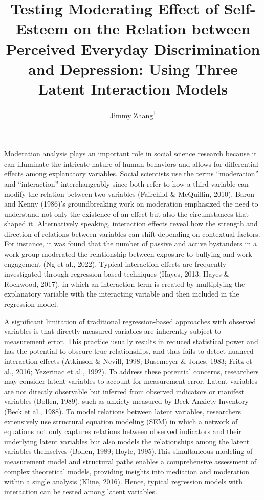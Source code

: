 \documentclass[
  man]{apa7}
\title{Testing Moderating Effect of Self-Esteem on the Relation between Perceived Everyday Discrimination and Depression: Using Three Latent Interaction Models}
\author{Jimmy Zhang\textsuperscript{1}}
\date{}
\affiliation{\vspace{0.5cm}\textsuperscript{1} University of Southhern California}
\begin{document}
\maketitle

Moderation analysis plays an important role in social science research because it can illuminate the intricate nature of human behaviors and allows for differential effects among explanatory variables. Social scientists use the terms ``moderation'' and ``interaction'' interchangeably since both refer to how a third variable can modify the relation between two variables (Fairchild \& McQuillin, 2010). Baron and Kenny (1986)'s groundbreaking work on moderation emphasized the need to understand not only the existence of an effect but also the circumstances that shaped it. Alternatively speaking, interaction effects reveal how the strength and direction of relations between variables can shift depending on contextual factors. For instance, it was found that the number of passive and active bystanders in a work group moderated the relationship between exposure to bullying and work engagement (Ng et al., 2022). Typical interaction effects are frequently investigated through regression-based techniques (Hayes, 2013; Hayes \& Rockwood, 2017), in which an interaction term is created by multiplying the explanatory variable with the interacting variable and then included in the regression model.

A significant limitation of traditional regression-based approaches with observed variables is that directly measured variables are inherently subject to measurement error. This practice usually results in reduced statistical power and has the potential to obscure true relationships, and thus fails to detect nuanced interaction effects (Atkinson \& Nevill, 1998; Busemeyer \& Jones, 1983; Fritz et al., 2016; Yezerinac et al., 1992). To address these potential concerns, researchers may consider latent variables to account for measurement error. Latent variables are not directly observable but inferred from observed indicators or manifest variables (Bollen, 1989), such as anxiety measured by Beck Anxiety Inventory (Beck et al., 1988). To model relations between latent variables, researchers extensively use structural equation modeling (SEM) in which a network of equations not only captures relations between observed indicators and their underlying latent variables but also models the relationships among the latent variables themselves (Bollen, 1989; Hoyle, 1995).This simultaneous modeling of measurement model and structural paths enables a comprehensive assessment of complex theoretical models, providing insights into mediation and moderation within a single analysis (Kline, 2016). Hence, typical regression models with interaction can be tested among latent variables.
\end{document}
